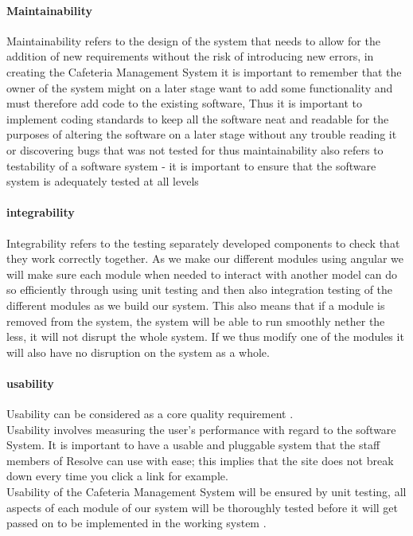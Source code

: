 \documentclass[12pt]{article}
\begin{document}
\paragraph{Maintainability\\}
Maintainability refers to the design of the system that needs to allow for the addition of new requirements without the risk of introducing new errors, in creating the Cafeteria Management System it is important to remember that the owner of the system might on a later stage want to add some functionality and must therefore add code to the existing software, Thus it is important to implement coding standards to keep all the software neat and readable for the purposes of altering the software on a later stage without any trouble reading it or discovering bugs that was not tested for thus maintainability also refers to testability of a software system - it is important to ensure that the software system is adequately tested at all levels

\paragraph{integrability\\}
Integrability  refers to the testing separately developed components to check that they work correctly together. As we make our different  modules using angular we will make sure each module when needed to interact with another model can do so efficiently through using unit testing and then also integration testing of the different modules as we build our system. This also means that if a module is removed from the system, the system will be able to run smoothly nether the less, it will not disrupt the whole system. If we thus modify one of the modules it will also have no disruption on the system as a whole. 

\paragraph{usability\\}
Usability can be considered as a core quality requirement . \\
Usability involves measuring the user's performance with regard to the software System.  It is important to have a usable and pluggable system that the staff members of Resolve can use with ease; this implies that the site does not break down every time you click a link for example. \\
Usability of the Cafeteria Management System will be ensured by unit testing, all aspects of each module of our system will be thoroughly  tested before it will get passed on to be implemented in the working system .
\end{document}
